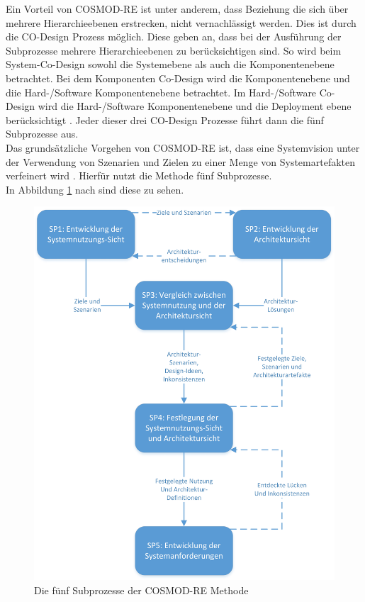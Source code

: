 Ein Vorteil von COSMOD-RE ist unter anderem, dass Beziehung die sich \"uber mehrere Hierarchieebenen erstrecken, nicht vernachl\"assigt werden. Dies ist durch die CO-Design Prozess m\"oglich. Diese geben an, dass bei der Ausf\"uhrung der Subprozesse mehrere Hierarchieebenen zu ber\"ucksichtigen sind. So wird beim System-Co-Design sowohl die Systemebene als auch die Komponentenebene betrachtet. Bei dem Komponenten Co-Design wird die Komponentenebene und diie Hard-/Software Komponentenebene betrachtet. Im Hard-/Software Co-Design wird die Hard-/Software Komponentenebene und die Deployment ebene ber\"ucksichtigt \cite{Poh02}. Jeder dieser drei CO-Design Prozesse f\"uhrt dann die f\"unf Subprozesse aus.\\ 

Das grunds\"atzliche Vorgehen von COSMOD-RE ist, dass eine Systemvision unter der Verwendung von Szenarien und Zielen zu einer Menge von Systemartefakten verfeinert wird \cite{Poh01}. Hierf\"ur nutzt die Methode f\"unf Subprozesse. \\

In Abbildung \ref{pro5} nach \cite{Poh01} sind diese zu sehen. 

\begin{figure}[h]
	\centering
	\includegraphics[scale=0.65]{COSMODRE5prozesse.jpg} 
	\caption{Die f\"unf Subprozesse der COSMOD-RE Methode}\label{pro5}
\end{figure}

